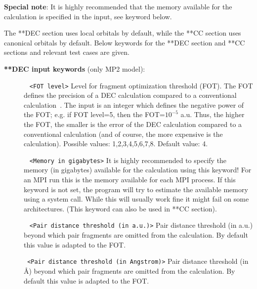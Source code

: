 \textbf{Special note}: It is highly recommended that the memory available for the calculation is specified in the input, see  keyword below.

The **DEC section uses local orbitals by default, while the **CC section uses canonical orbitals by default.
Below keywords for the **DEC section and **CC sections and relevant test cases are given. 

\vspace{1 cm}
\noindent
\textbf{**DEC input keywords} (only MP2 model):

\begin{description}
\item[]\verb| | \newline
\verb|<FOT level>|\newline
Level for fragment optimization threshold (FOT). The FOT defines the precision of a DEC calculation compared
to a conventional calculation~\cite{dec1,dec2,dec3,dec4,dec5,dec6}.
The input is an integer which defines the negative power of the FOT; e.g. if FOT level=5, then the FOT=$10^{-5}$ a.u.
Thus, the higher the FOT, the smaller is the error of the DEC calculation compared to a conventional calculation (and of course, the more expensive is the calculation). Possible values: 1,2,3,4,5,6,7,8. Default value: 4.


\item[] \verb| | \newline
\verb|<Memory in gigabytes>| \newline
It is highly recommended to specify the memory (in gigabytes) available for the calculation using this keyword! For an MPI run this is the memory available for each MPI process.
If this keyword is not set, the program will try to estimate the available memory using a system call. While this will usually work fine it might fail on some architectures.
(This keyword can also be used in **CC section).


\item[] \verb| | \newline
\verb|<Pair distance threshold (in a.u.)>|\newline
Pair distance threshold (in a.u.) beyond which pair fragments are omitted from the calculation. By default this value is adapted to the FOT.

\item[]  \verb| | \newline
\verb|<Pair distance threshold (in Angstrom)>|\newline
Pair distance threshold (in {\AA}) beyond which pair fragments are omitted from the calculation. By default this value is adapted to the FOT.



\end{description}
